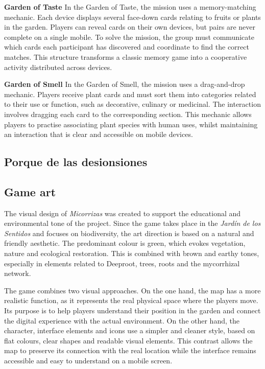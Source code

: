 \textbf{Garden of Taste}
In the Garden of Taste, the mission uses a memory-matching mechanic. Each device displays several face-down cards relating to fruits or plants in the garden. Players can reveal cards on their own devices, but pairs are never complete on a single mobile. To solve the mission, the group must communicate which cards each participant has discovered and coordinate to find the correct matches. This structure transforms a classic memory game into a cooperative activity distributed across devices.

\textbf{Garden of Smell}
In the Garden of Smell, the mission uses a drag-and-drop mechanic. Players receive plant cards and must sort them into categories related to their use or function, such as decorative, culinary or medicinal. The interaction involves dragging each card to the corresponding section. This mechanic allows players to practise associating plant species with human uses, whilst maintaining an interaction that is clear and accessible on mobile devices.

\subsection{Porque de las desionsiones}


\subsection{Game art}
The visual design of \textit{Micorrizas} was created to support the educational and environmental tone of the project. Since the game takes place in the \textit{Jardín de los Sentidos} and focuses on biodiversity, the art direction is based on a natural and friendly aesthetic. The predominant colour is green, which evokes vegetation, nature and ecological restoration. This is combined with brown and earthy tones, especially in elements related to Deeproot, trees, roots and the mycorrhizal network.

The game combines two visual approaches. On the one hand, the map has a more realistic function, as it represents the real physical space where the players move. Its purpose is to help players understand their position in the garden and connect the digital experience with the actual environment. On the other hand, the character, interface elements and icons use a simpler and cleaner style, based on flat colours, clear shapes and readable visual elements. This contrast allows the map to preserve its connection with the real location while the interface remains accessible and easy to understand on a mobile screen.

